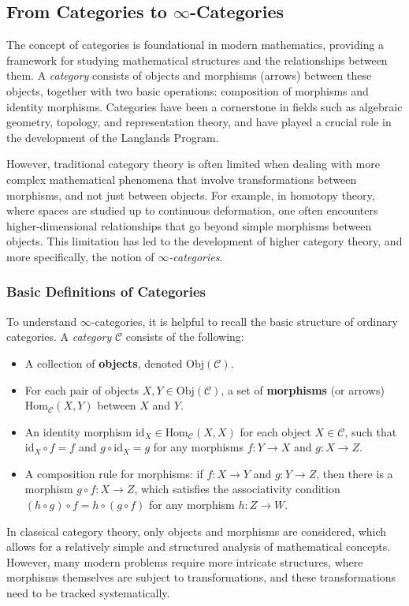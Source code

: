 \documentclass{article}
\theoremstyle{remark}
\begin{document}
\subsection{From Categories to $\infty$-Categories}

The concept of categories is foundational in modern mathematics, providing a framework for studying mathematical structures and the relationships between them. A \textit{category} consists of objects and morphisms (arrows) between these objects, together with two basic operations: composition of morphisms and identity morphisms. Categories have been a cornerstone in fields such as algebraic geometry, topology, and representation theory, and have played a crucial role in the development of the Langlands Program.

However, traditional category theory is often limited when dealing with more complex mathematical phenomena that involve transformations between morphisms, and not just between objects. For example, in homotopy theory, where spaces are studied up to continuous deformation, one often encounters higher-dimensional relationships that go beyond simple morphisms between objects. This limitation has led to the development of higher category theory, and more specifically, the notion of \emph{$\infty$-categories}.

\subsubsection{Basic Definitions of Categories}

To understand $\infty$-categories, it is helpful to recall the basic structure of ordinary categories. A \textit{category} $\mathcal{C}$ consists of the following:
\begin{itemize}
    \item A collection of \textbf{objects}, denoted $\text{Obj}(\mathcal{C})$.
    \item For each pair of objects $X, Y \in \text{Obj}(\mathcal{C})$, a set of \textbf{morphisms} (or arrows) $\text{Hom}_{\mathcal{C}}(X, Y)$ between $X$ and $Y$.
    \item An identity morphism $\text{id}_X \in \text{Hom}_{\mathcal{C}}(X, X)$ for each object $X \in \mathcal{C}$, such that $\text{id}_X \circ f = f$ and $g \circ \text{id}_X = g$ for any morphisms $f: Y \to X$ and $g: X \to Z$.
    \item A composition rule for morphisms: if $f: X \to Y$ and $g: Y \to Z$, then there is a morphism $g \circ f: X \to Z$, which satisfies the associativity condition $(h \circ g) \circ f = h \circ (g \circ f)$ for any morphism $h: Z \to W$.
\end{itemize}
In classical category theory, only objects and morphisms are considered, which allows for a relatively simple and structured analysis of mathematical concepts. However, many modern problems require more intricate structures, where morphisms themselves are subject to transformations, and these transformations need to be tracked systematically.
\end{document}
